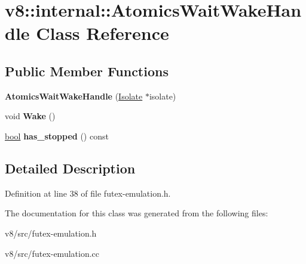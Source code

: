 \hypertarget{classv8_1_1internal_1_1AtomicsWaitWakeHandle}{}\section{v8\+:\+:internal\+:\+:Atomics\+Wait\+Wake\+Handle Class Reference}
\label{classv8_1_1internal_1_1AtomicsWaitWakeHandle}
\subsection*{Public Member Functions}
\begin{DoxyCompactItemize}
\item 
\mbox{\label{classv8_1_1internal_1_1AtomicsWaitWakeHandle_aac73e4ee2c56ae3bdf4b076542cd5681}} 
{\bfseries Atomics\+Wait\+Wake\+Handle} (\mbox{\hyperlink{classv8_1_1internal_1_1Isolate}{Isolate}} $\ast$isolate)
\item 
\mbox{\label{classv8_1_1internal_1_1AtomicsWaitWakeHandle_abe1eaacfebde3fd6cad023692908cae3}} 
void {\bfseries Wake} ()
\item 
\mbox{\label{classv8_1_1internal_1_1AtomicsWaitWakeHandle_a21f9df17da6972a8818776d2290476dc}} 
\mbox{\hyperlink{classbool}{bool}} {\bfseries has\+\_\+stopped} () const
\end{DoxyCompactItemize}


\subsection{Detailed Description}


Definition at line 38 of file futex-\/emulation.\+h.



The documentation for this class was generated from the following files\+:\begin{DoxyCompactItemize}
\item 
v8/src/futex-\/emulation.\+h\item 
v8/src/futex-\/emulation.\+cc\end{DoxyCompactItemize}
